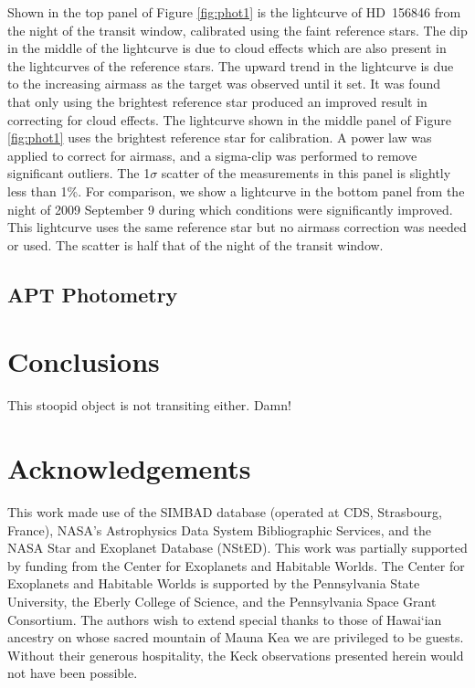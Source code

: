 \documentclass[12pt,preprint]{emulateapj}
\begin{document}
Shown in the top panel of Figure \ref{fig:phot1} is the lightcurve of
HD~156846 from the night of the transit window, calibrated using the
faint reference stars. The dip in the middle of the lightcurve is due
to cloud effects which are also present in the lightcurves of the
reference stars. The upward trend in the lightcurve is due to the
increasing airmass as the target was observed until it set. It was
found that only using the brightest reference star produced an
improved result in correcting for cloud effects. The lightcurve shown
in the middle panel of Figure \ref{fig:phot1} uses the brightest
reference star for calibration. A power law was applied to correct for
airmass, and a sigma-clip was performed to remove significant
outliers. The 1$\sigma$ scatter of the measurements in this panel is
slightly less than 1\%. For comparison, we show a lightcurve in the
bottom panel from the night of 2009 September 9 during which
conditions were significantly improved. This lightcurve uses the same
reference star but no airmass correction was needed or used. The
scatter is half that of the night of the transit window.

\subsection{APT Photometry}

\section{Conclusions}

This stoopid object is not transiting either. Damn!


\section*{Acknowledgements}

This work made use of the
SIMBAD database (operated at CDS, Strasbourg, France), NASA's
Astrophysics Data System Bibliographic Services, and the NASA Star and
Exoplanet Database (NStED). This work was partially supported by
funding from the Center for Exoplanets and Habitable Worlds. The
Center for Exoplanets and Habitable Worlds is supported by the
Pennsylvania State University, the Eberly College of Science, and the
Pennsylvania Space Grant Consortium.  The authors wish to
extend special thanks to those of Hawai`ian ancestry on whose sacred
mountain of Mauna Kea we are privileged to be guests. Without their
generous hospitality, the Keck observations presented herein would not
have been possible.
\end{document}
